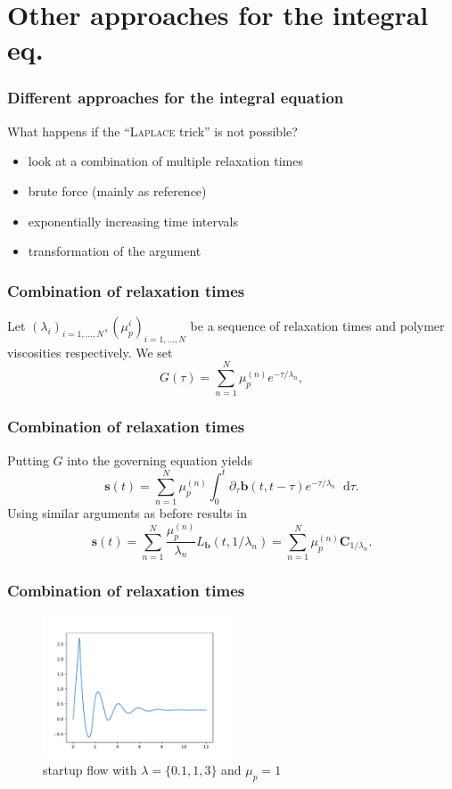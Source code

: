 \documentclass[12pt,a4paper,handout]{beamer}
\theoremstyle{definition}
\theoremstyle{plain}
\newcommand{\bfb}{\bm{b}}
\newcommand{\bfs}{\bm{s}}
\newcommand{\bfC}{\bm{C}}
\newcommand{\D}{\mathop{}\!\mathrm{d}}
\begin{document}
\section{Other approaches for the integral eq.}
\begin{frame}
\frametitle{Different approaches for the integral equation}
    What happens if the \enquote{\textsc{Laplace} trick} is not possible? 
    \begin{itemize}[<+->]
        \item look at a combination of multiple relaxation times
        \item brute force (mainly as reference)
        \item exponentially increasing time intervals
        \item transformation of the argument
    \end{itemize}
\end{frame}
\begin{frame}
    \frametitle{Combination of relaxation times}
    Let $(\lambda_i)_{i=1,\dotsc,N},(\mu_p^i)_{i=1,\dotsc,N}$ be a sequence of relaxation times and polymer viscosities respectively. We set
    \begin{equation*}
    G(\tau)=\sum_{n=1}^{N}\mu_p^{(n)}e^{-\tau/\lambda_n},
    \end{equation*}
\end{frame}
\begin{frame}
    \frametitle{Combination of relaxation times}
    Putting $G$ into the governing equation yields
    \begin{equation*}
    \bfs(t) = \sum_{n=1}^{N}\mu_p^{(n)}\int_0^t\partial_\tau \bfb(t,t-\tau)e^{-\tau/\lambda_n}\D\tau.
    \end{equation*}
    Using similar arguments as before results in 
    \begin{equation}
    \bfs(t)=\sum_{n=1}^N\frac{\mu_p^{(n)}}{\lambda_n}L_{\bfb}(t,1/\lambda_n)=\sum_{n=1}^N\mu_p^{(n)}\bfC_{1/\lambda_n}.
    \end{equation}
\end{frame}
\begin{frame}
    \frametitle{Combination of relaxation times}
    \begin{figure}
        \centering
        \includegraphics[width=0.5\textwidth]{multilam}
        \caption{startup flow with $\lambda=\{0.1,1,3\}$ and $\mu_p=1$}
    \end{figure}
\end{frame}
\end{document}
